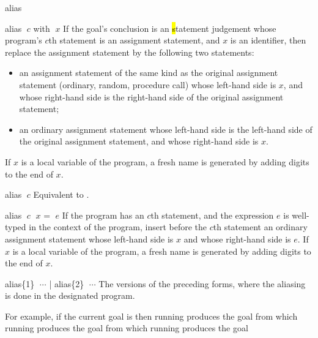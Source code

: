 \begin{tactic}{alias}
  \begin{tsyntax}{alias $\;c$ with $\;x$}
    If the goal's conclusion is an \hl statement judgement whose
    program's $c$th statement is an assignment statement, and $x$ is
    an identifier, then replace the assignment statement by the
    following two statements:
    \begin{itemize}
    \item an assignment statement of the same kind as the original
      assignment statement (ordinary, random, procedure call) whose
      left-hand side is $x$, and whose right-hand side is the
      right-hand side of the original assignment statement;

    \item an ordinary assignment statement whose left-hand side is
      the left-hand side of the original assignment statement,
      and whose right-hand side is $x$.
    \end{itemize}
    If $x$ is a local variable of the program, a fresh name is
    generated by adding digits to the end of $x$.
  \end{tsyntax}

  \begin{tsyntax}{alias $\;c$}
    Equivalent to .
  \end{tsyntax}

  \begin{tsyntax}{alias $\;c$ $\;x$ = $\;e$}
    If the program has an $c$th statement, and the expression $e$ is
    well-typed in the context of the program, insert before the $c$th
    statement an ordinary assignment statement whose left-hand side is
    $x$ and whose right-hand side is $e$.
    If $x$ is a local variable of the program, a fresh name is
    generated by adding digits to the end of $x$.
  \end{tsyntax}

  \begin{tsyntax}{alias\{1\} $\;\cdots$ | alias\{2\} $\;\cdots$}
    The \prhl versions of the preceding forms, where the aliasing
    is done in the designated program.
  \end{tsyntax}

  \bigskip For example, if the current goal is
   then running
   produces the
  goal 
  from which running
   produces the
  goal 
  from which running
   produces the
  goal 
\end{tactic}
